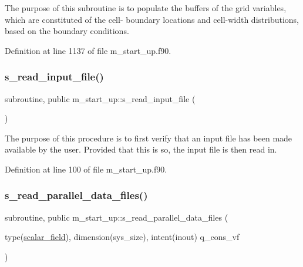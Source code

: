 The purpose of this subroutine is to populate the buffers of the grid variables, which are constituted of the cell-\/ boundary locations and cell-\/width distributions, based on the boundary conditions. 



Definition at line 1137 of file m\+\_\+start\+\_\+up.\+f90.

\mbox{\label{namespacem__start__up_ae0571e78c0179c22d3811df31c33c321}} 
\subsubsection{\texorpdfstring{s\+\_\+read\+\_\+input\+\_\+file()}{s\_read\_input\_file()}}
{\footnotesize\ttfamily subroutine, public m\+\_\+start\+\_\+up\+::s\+\_\+read\+\_\+input\+\_\+file (\begin{DoxyParamCaption}{ }\end{DoxyParamCaption})}



The purpose of this procedure is to first verify that an input file has been made available by the user. Provided that this is so, the input file is then read in. 



Definition at line 100 of file m\+\_\+start\+\_\+up.\+f90.

\mbox{\label{namespacem__start__up_a45c8fef6680263063a1c7d2fa1748013}} 
\subsubsection{\texorpdfstring{s\+\_\+read\+\_\+parallel\+\_\+data\+\_\+files()}{s\_read\_parallel\_data\_files()}}
{\footnotesize\ttfamily subroutine, public m\+\_\+start\+\_\+up\+::s\+\_\+read\+\_\+parallel\+\_\+data\+\_\+files (\begin{DoxyParamCaption}\item[{type(\hyperlink{structm__derived__types_1_1scalar__field}{scalar\+\_\+field}), dimension(sys\+\_\+size), intent(inout)}]{q\+\_\+cons\+\_\+vf }\end{DoxyParamCaption})}



